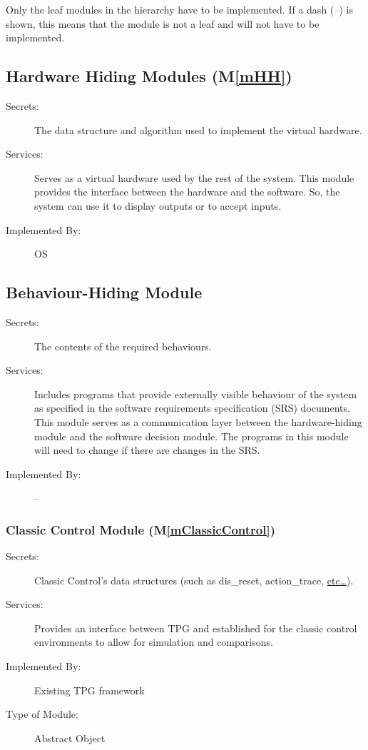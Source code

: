 \documentclass[12pt, titlepage]{article}
\newcommand{\mref}[1]{M\ref{#1}}
\begin{document}
Only the leaf modules in the hierarchy have to be implemented. If a dash
(\emph{--}) is shown, this means that the module is not a leaf and will not have
to be implemented.

\subsection{Hardware Hiding Modules (\mref{mHH})}

\begin{description}
\item[Secrets:]The data structure and algorithm used to implement the virtual
  hardware.
\item[Services:]Serves as a virtual hardware used by the rest of the
  system. This module provides the interface between the hardware and the
  software. So, the system can use it to display outputs or to accept inputs.
\item[Implemented By:] OS
\end{description}

\subsection{Behaviour-Hiding Module}

\begin{description}
\item[Secrets:]The contents of the required behaviours.
\item[Services:]Includes programs that provide externally visible behaviour of
  the system as specified in the software requirements specification (SRS)
  documents. This module serves as a communication layer between the
  hardware-hiding module and the software decision module. The programs in this
  module will need to change if there are changes in the SRS.
\item[Implemented By:] --
\end{description}

\subsubsection{Classic Control Module (\mref{mClassicControl})}

\begin{description}
\item[Secrets:]Classic Control's data structures (such as dis\_reset, action\_trace, \href{https://github.com/TPGEngine/tpg/blob/main/src/src/environments/classic_control/ClassicControlEnv.h}{etc…}).
\item[Services:]Provides an interface between TPG and established for the classic control environments to allow for simulation and comparisons.
\item[Implemented By:] Existing TPG framework
\item[Type of Module:] Abstract Object
\end{description}
\end{document}
